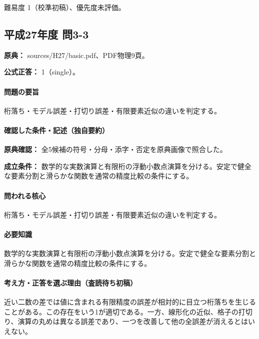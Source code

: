 \par 難易度 1（校準初稿）、優先度未評価。

\subsection{平成27年度 問3-3}
\label{q:h27-reg-basic-3-3}

\noindent\textbf{原典：} sources/H27/basic.pdf、PDF物理9頁。

\textbf{公式正答：} 1（single）。

\paragraph{問題の要旨} 桁落ち・モデル誤差・打切り誤差・有限要素近似の違いを判定する。

\paragraph{確認した条件・記述（独自要約）}\mbox{}\par

\noindent\textbf{原典確認：} 全5候補の符号・分母・添字・否定を原典画像で照合した。\par

\noindent\textbf{成立条件：} 数学的な実数演算と有限桁の浮動小数点演算を分ける。安定で健全な要素分割と滑らかな関数を通常の精度比較の条件にする。\par

\paragraph{問われる核心} 桁落ち・モデル誤差・打切り誤差・有限要素近似の違いを判定する。

\paragraph{必要知識} 数学的な実数演算と有限桁の浮動小数点演算を分ける。安定で健全な要素分割と滑らかな関数を通常の精度比較の条件にする。

\paragraph{考え方・正答を選ぶ理由（査読待ち初稿）} 近い二数の差では値に含まれる有限精度の誤差が相対的に目立つ桁落ちを生じることがある。この存在をいう1が適切である。一方、線形化の近似、格子の打切り、演算の丸めは異なる誤差であり、一つを改善して他の全誤差が消えるとはいえない。

